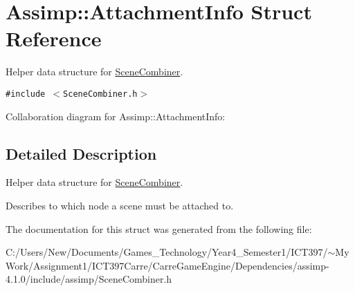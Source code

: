 \hypertarget{struct_assimp_1_1_attachment_info}{
\section{Assimp::AttachmentInfo Struct Reference}
\label{struct_assimp_1_1_attachment_info}
}
Helper data structure for \hyperlink{class_assimp_1_1_scene_combiner}{SceneCombiner}.  


{\tt \#include $<$SceneCombiner.h$>$}

Collaboration diagram for Assimp::AttachmentInfo:

\subsection{Detailed Description}
Helper data structure for \hyperlink{class_assimp_1_1_scene_combiner}{SceneCombiner}. 

Describes to which node a scene must be attached to. 

The documentation for this struct was generated from the following file:\begin{CompactItemize}
\item 
C:/Users/New/Documents/Games\_\-Technology/Year4\_\-Semester1/ICT397/$\sim$My Work/Assignment1/ICT397Carre/CarreGameEngine/Dependencies/assimp-4.1.0/include/assimp/SceneCombiner.h\end{CompactItemize}
